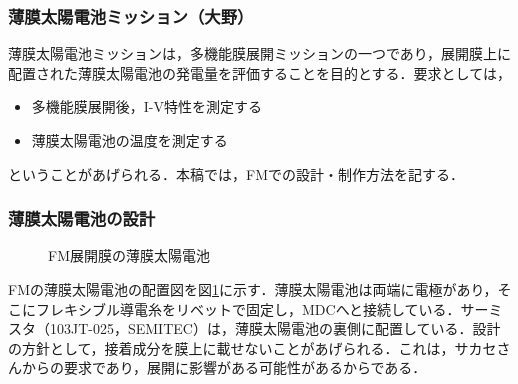 \subsubsection{薄膜太陽電池ミッション（大野）}
薄膜太陽電池ミッションは，多機能膜展開ミッションの一つであり，展開膜上に配置された薄膜太陽電池の発電量を評価することを目的とする．要求としては，
\begin{itemize}
	\item 多機能膜展開後，I-V特性を測定する
	\item 薄膜太陽電池の温度を測定する
\end{itemize}
ということがあげられる．本稿では，FMでの設計・制作方法を記する．

\subsubsection*{薄膜太陽電池の設計}
\begin{figure}[H]
	\centering
	\caption{FM展開膜の薄膜太陽電池}
	\label{fig3-9-3-1}
\end{figure}
FMの薄膜太陽電池の配置図を図\ref{fig3-9-3-1}に示す．薄膜太陽電池は両端に電極があり，そこにフレキシブル導電糸をリベットで固定し，MDCへと接続している．サーミスタ（103JT-025，SEMITEC）は，薄膜太陽電池の裏側に配置している．設計の方針として，接着成分を膜上に載せないことがあげられる．これは，サカセさんからの要求であり，展開に影響がある可能性があるからである．


